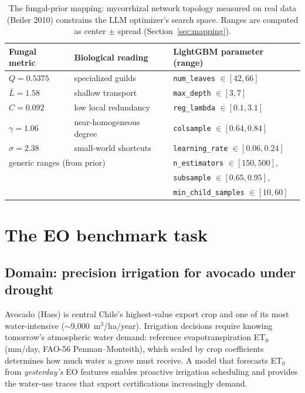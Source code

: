 \documentclass[11pt]{article}
\begin{document}
\begin{table}[t]
\centering
\small
\begin{tabular}{lll}
\toprule
Fungal metric & Biological reading & LightGBM parameter (range) \\
\midrule
$Q=0.5375$ & specialized guilds & \texttt{num\_leaves} $\in[42,66]$ \\
$\bar L=1.58$ & shallow transport & \texttt{max\_depth} $\in[3,7]$ \\
$C=0.092$ & low local redundancy & \texttt{reg\_lambda} $\in[0.1,3.1]$ \\
$\gamma=1.06$ & near-homogeneous degree & \texttt{colsample} $\in[0.64,0.84]$ \\
$\sigma=2.38$ & small-world shortcuts & \texttt{learning\_rate} $\in[0.06,0.24]$ \\
\midrule
\multicolumn{2}{l}{generic ranges (from prior)} &
\texttt{n\_estimators} $\in[150,500]$,\\
\multicolumn{2}{l}{} & \texttt{subsample} $\in[0.65,0.95]$,\\
\multicolumn{2}{l}{} & \texttt{min\_child\_samples} $\in[10,60]$\\
\bottomrule
\end{tabular}
\caption{The fungal-prior mapping: mycorrhizal network topology measured on real
data (Beiler 2010) constrains the LLM optimizer's search space. Ranges are
computed as center $\pm$ spread (Section~\ref{sec:mapping}).}
\label{tab:mapping}
\end{table}

\section{The EO benchmark task}
\label{sec:task}

\subsection{Domain: precision irrigation for avocado under drought}
\label{sec:domain}

Avocado (Hass) is central Chile's highest-value export crop and one of its
most water-intensive ($\sim$9{,}000~m$^3$/ha/year). Irrigation decisions
require knowing tomorrow's atmospheric water demand: reference
evapotranspiration ET$_0$ (mm/day, FAO-56 Penman--Monteith), which scaled by
crop coefficients determines how much water a grove must receive. A model that
forecasts ET$_0$ from \emph{yesterday's} EO features enables proactive
irrigation scheduling and provides the water-use traces that export
certifications increasingly demand.
\end{document}
